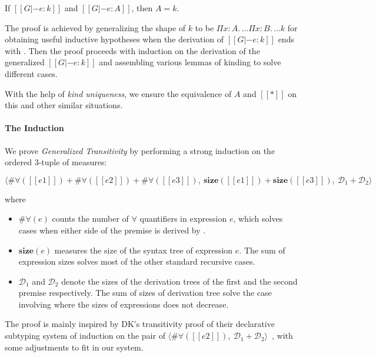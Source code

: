 \begin{theorem}
    If $[[G |- e : k]]$ and $[[G |- e : A]]$,
    then $A = k$.
\end{theorem}

\noindent The proof is achieved by generalizing the shape of $k$ to be
$\Pi x : A.\, \dots \Pi x : B.\, \dots k$ for obtaining useful inductive hypotheses
when the derivation of $[[G |- e : k]]$ ends with . Then the proof
proceeds with induction on the derivation of the generalized $[[G |- e : k]]$ and
assembling various lemmas of kinding to solve different cases.

With the help of \emph{kind uniqueness},
we ensure the equivalence of $A$ and $[[*]]$ on this and other similar situations.

\paragraph{The Induction}

We prove \emph{Generalized Transitivity} by performing a strong induction on
the ordered 3-tuple of measures:

$$
\langle \#\forall([[e1]]) + \#\forall([[e2]]) + \#\forall([[e3]]), ~
\mathbf{size}([[e1]]) + \mathbf{size}([[e3]]), ~
\mathcal{D}_1 + \mathcal{D}_2 \rangle
$$

\noindent where

\begin{itemize}
    \item $\#\forall(e)$ counts the number of $\forall$ quantifiers
    in expression $e$, which solves cases when either side of the premise is
    derived by .
    \item $\mathbf{size}(e)$ measures the size of the syntax tree of
    expression $e$. The sum of expression sizes solves most of the other
    standard recursive cases.
    \item $\mathcal{D}_1$ and $\mathcal{D}_2$ denote the sizes of the derivation
    trees of the first and the second premise respectively. The sum of sizes
    of derivation tree solve the case involving  where the sizes of
    expressions does not decrease.
\end{itemize}

The proof is mainly inspired by DK's transitivity proof of their declarative subtyping
system of induction on the pair of
$\langle \#\forall([[e2]]) ,~ \mathcal{D}_1 + \mathcal{D}_2 \rangle$~\citep{dunfield2013lemmas},
with some adjustments to fit in our system.

